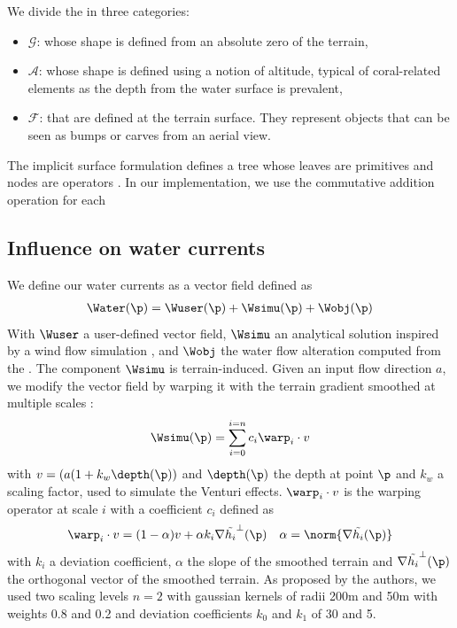 We divide the  in three categories: 
\begin{itemize}
    \item $\mathcal{G}$:  whose shape is defined from an absolute zero of the terrain,
    \item $\mathcal{A}$:  whose shape is defined using a notion of altitude, typical of coral-related elements as the depth from the water surface is prevalent,
    \item $\mathcal{F}$:  that are defined at the terrain surface. They represent objects that can be seen as bumps or carves from an aerial view. 
\end{itemize}



The implicit surface formulation defines a tree whose leaves are primitives and nodes are operators \cite{Bernhardt2010,Wyvill1999}. In our implementation, we use the commutative addition operation for each 

\subsection{Influence on water currents}
\label{sec:semantic-representation_water-currents}
We define our water currents as a vector field defined as 
\begin{align*}
    \Water(\p) = \Wuser(\p) + \Wsimu(\p) + \Wobj(\p)
\end{align*}
With $\Wuser$ a user-defined vector field, $\Wsimu$ an analytical solution inspired by a wind flow simulation \cite{Paris2020}, and $\Wobj$ the water flow alteration computed from the . 
The component $\Wsimu$ is terrain-induced. Given an input flow direction $a$, we modify the vector field by warping it with the terrain gradient smoothed at multiple scales :
\begin{align*}
    \Wsimu(\p) = \sum_{i=0}^{i=n}{c_i \warp_i \cdot v}
\end{align*}
with $v = (a (1 + k_w \depth(\p))$ and $\depth(\p)$ the depth at point $\p$ and $k_w$ a scaling factor, used to simulate the Venturi effects. $\warp_i \cdot v$ is the warping operator at scale $i$ with a coefficient $c_i$ defined as 
\begin{align*}
& \warp_i \cdot v = (1 - \alpha) v + \alpha k_i \nabla \Tilde{h_i}^{\perp}(\p) & \alpha = \norm{ \nabla \Tilde{h_i}(\p) }
\end{align*}
with $k_i$ a deviation coefficient, $\alpha$ the slope of the smoothed terrain and $\nabla \Tilde{h_i}^{\perp}(\p)$ the orthogonal vector of the smoothed terrain. As proposed by the authors, we used two scaling levels $n = 2$ with gaussian kernels of radii \si{200}{m} and \si{50}{m} with weights 0.8 and 0.2 and deviation coefficients $k_0$ and $k_1$ of 30 and 5.


